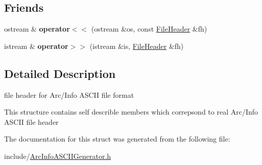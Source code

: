 \subsection*{\-Friends}
\begin{DoxyCompactItemize}
\item 
\hypertarget{structArcInfoASCIIGenerator_1_1FileHeader_ad915f5c60819769ec761078664f42227}{ostream \& {\bfseries operator$<$$<$} (ostream \&os, const \hyperlink{structArcInfoASCIIGenerator_1_1FileHeader}{\-File\-Header} \&fh)}\label{structArcInfoASCIIGenerator_1_1FileHeader_ad915f5c60819769ec761078664f42227}

\item 
\hypertarget{structArcInfoASCIIGenerator_1_1FileHeader_a4f321889db256758ae5ef68527a1e698}{istream \& {\bfseries operator$>$$>$} (istream \&is, \hyperlink{structArcInfoASCIIGenerator_1_1FileHeader}{\-File\-Header} \&fh)}\label{structArcInfoASCIIGenerator_1_1FileHeader_a4f321889db256758ae5ef68527a1e698}

\end{DoxyCompactItemize}


\subsection{\-Detailed \-Description}
file header for \-Arc/\-Info \-A\-S\-C\-I\-I file format 

\-This structure contains self describle members which correpsond to real \-Arc/\-Info \-A\-S\-C\-I\-I file header 

\-The documentation for this struct was generated from the following file\-:\begin{DoxyCompactItemize}
\item 
include/\hyperlink{ArcInfoASCIIGenerator_8h}{\-Arc\-Info\-A\-S\-C\-I\-I\-Generator.\-h}\end{DoxyCompactItemize}
